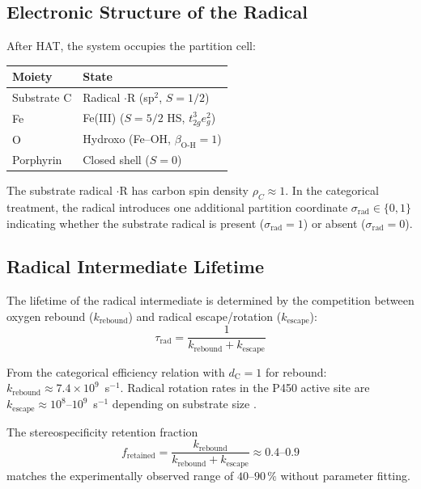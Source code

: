 \documentclass[11pt,twocolumn,a4paper]{article}
\theoremstyle{definition}
\theoremstyle{remark}
\newcommand{\dC}{d_{\mathrm{C}}}
\newcommand{\betaOH}{\beta_{\mathrm{O\text{-}H}}}
\newcommand{\krebound}{k_{\mathrm{rebound}}}
\begin{document}
\subsection{Electronic Structure of the Radical}

After HAT, the system occupies the partition cell:
\begin{center}
\small
\begin{tabular}{ll}
\toprule
Moiety & State \\
\midrule
Substrate C & Radical $\cdot$R (sp$^2$, $S = 1/2$) \\
Fe & Fe(III) ($S = 5/2$ HS, $t_{2g}^3 e_g^2$) \\
O & Hydroxo (Fe--OH, $\betaOH = 1$) \\
Porphyrin & Closed shell ($S = 0$) \\
\bottomrule
\end{tabular}
\end{center}

The substrate radical $\cdot$R has carbon spin density $\rho_C \approx 1$.
In the categorical treatment, the radical introduces one additional partition
coordinate $\sigma_{\mathrm{rad}} \in \{0, 1\}$ indicating whether the
substrate radical is present ($\sigma_{\mathrm{rad}} = 1$) or absent
($\sigma_{\mathrm{rad}} = 0$).

\subsection{Radical Intermediate Lifetime}

The lifetime of the radical intermediate is determined by the competition
between oxygen rebound ($\krebound$) and radical escape/rotation
($k_{\mathrm{escape}}$):
\begin{equation}
\tau_{\mathrm{rad}} = \frac{1}{\krebound + k_{\mathrm{escape}}}
\label{eq:radical_lifetime}
\end{equation}

From the categorical efficiency relation with $\dC = 1$ for rebound:
$\krebound \approx 7.4 \times 10^9$~s$^{-1}$. Radical rotation rates in
the P450 active site are $k_{\mathrm{escape}} \approx 10^8$--$10^9$~s$^{-1}$
depending on substrate size \citep{newcomb1995, newcomb1997}.

The stereospecificity retention fraction
\begin{equation}
f_{\mathrm{retained}} = \frac{\krebound}{\krebound + k_{\mathrm{escape}}} \approx 0.4\text{--}0.9
\label{eq:stereo_retention}
\end{equation}
matches the experimentally observed range of $40$--$90\,\%$ without
parameter fitting.
\end{document}
